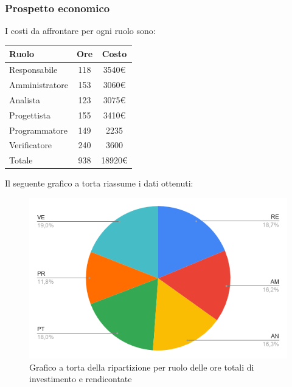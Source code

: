 {{{{{{{{{{{\subsubsection{Prospetto economico}\label{PreventivoRiepilogoOreTotaliProspettoEconomico}
I costi da affrontare per ogni ruolo sono:
\quad
\def\tabularxcolumn#1{m{#1}}
{	
	\begin{center}
		\renewcommand{\arraystretch}{1.4}
		\begin{tabularx}{7cm}{|X|c|c|}
			\hline
			\rowcolor{airforceblue}
			\textbf{Ruolo} & \textbf{Ore} & \textbf{Costo}\\
			\hline
			Responsabile & 118 & 3540\euro\\
			\hline
			Amministratore & 153 & 3060\euro\\
			\hline
			Analista & 123 & 3075\euro\\
			\hline
			Progettista & 155 & 3410\euro\\
			\hline
			Programmatore & 149 & 2235\\
			\hline
			Verificatore & 240 & 3600\\
			\hline
			Totale & 938 & 18920\euro\\
			\hline
		\end{tabularx}
	\end{center}

Il seguente grafico a torta riassume i dati ottenuti:
\begin{figure}[!ht]
	\begin{center}
		\includegraphics[width=0.8\linewidth]{../immagini/pdp/torta_suddvisione_lavoro.png}
		\caption{Grafico a torta della ripartizione per ruolo delle ore totali di investimento e
			rendicontate}
	\end{center}
\end{figure}

}}}}}}}}}}}}
